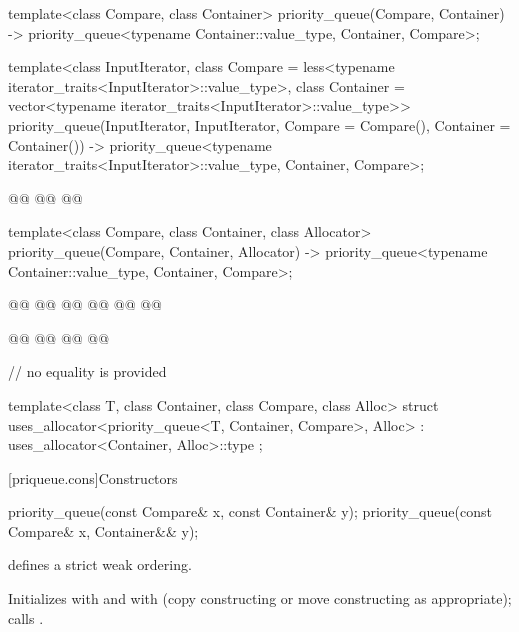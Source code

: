 \documentclass{wg21}
\begin{document}
\begin{codeblock}
{template<class Compare, class Container>
priority_queue(Compare, Container)
-> priority_queue<typename Container::value_type, Container, Compare>;

template<class InputIterator,
class Compare = less<typename iterator_traits<InputIterator>::value_type>,
class Container = vector<typename iterator_traits<InputIterator>::value_type>>
priority_queue(InputIterator, InputIterator, Compare = Compare(), Container = Container())
-> priority_queue<typename iterator_traits<InputIterator>::value_type, Container, Compare>;

@@
@@
@@

template<class Compare, class Container, class Allocator>
priority_queue(Compare, Container, Allocator)
-> priority_queue<typename Container::value_type, Container, Compare>;

@@
@@
@@
@@
@@
@@

@@
@@
@@
@@

// no equality is provided

template<class T, class Container, class Compare, class Alloc>
struct uses_allocator<priority_queue<T, Container, Compare>, Alloc>
: uses_allocator<Container, Alloc>::type { };
}
\end{codeblock}

[priqueue.cons]{Constructors}

%
\begin{itemdecl}
    priority_queue(const Compare& x, const Container& y);
    priority_queue(const Compare& x, Container&& y);
\end{itemdecl}

\begin{itemdescr}
    \pnum
    \expects
     defines a strict weak ordering.

    \pnum
    \effects
    Initializes
     with
     and
     with
     (copy constructing or move constructing as appropriate);
    calls
    .
\end{itemdescr}
\end{document}
